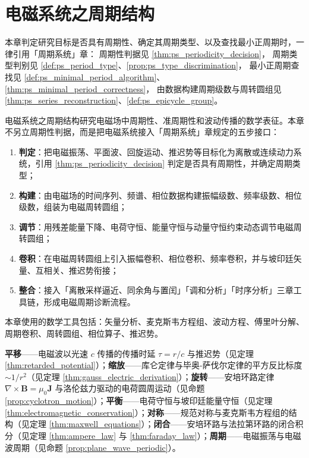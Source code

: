 \chapter{电磁系统之周期结构}

\begin{remark}[本章目标的周期性判定（引用）]\label{rem:em_ps_hook}
本章判定研究目标是否具有周期性、确定其周期类型、以及查找最小正周期时，一律引用「周期系统」章：
周期性判据见 \cref{thm:ps_periodicity_decision}，
周期类型判别见 \cref{def:ps_period_type}、\cref{prop:ps_type_discrimination}，
最小正周期查找见 \cref{def:ps_minimal_period_algorithm}、\cref{thm:ps_minimal_period_correctness}，
由数据构建周期级数与周转圆组见 \cref{thm:ps_series_reconstruction}、\cref{def:ps_epicycle_group}。
\end{remark}

\begin{remark}\label{rem:em_five_steps_positioning}
电磁系统之周期结构研究电磁场中周期性、准周期性和波动传播的数学表征。本章不另立周期性判据，而是把电磁系统接入「周期系统」章规定的五步接口：
\begin{enumerate}[label=(\arabic*)]
    \item \textbf{判定}：把电磁振荡、平面波、回旋运动、推迟势等目标化为离散或连续动力系统，引用 \cref{thm:ps_periodicity_decision} 判定是否具有周期性，并确定周期类型；
    \item \textbf{构建}：由电磁场的时间序列、频谱、相位数据构建振幅级数、频率级数、相位级数，组装为电磁周转圆组；
    \item \textbf{调节}：用残差能量下降、电荷守恒、能量守恒与动量守恒约束动态调节电磁周转圆组；
    \item \textbf{卷积}：在电磁周转圆组上引入振幅卷积、相位卷积、频率卷积，并与坡印廷矢量、互相关、推迟势衔接；
    \item \textbf{整合}：接入「离散采样逼近、同余角与置闰」「调和分析」「时序分析」三章工具链，形成电磁周期诊断流程。
\end{enumerate}
本章使用的数学工具包括：矢量分析、麦克斯韦方程组、波动方程、傅里叶分解、周期卷积、周转圆组、相位算子、推迟势。
\end{remark}

\begin{remark}[本章七主题导引]\label{rem:em_seven_themes}
\textbf{平移}——电磁波以光速 $c$ 传播的传播时延 $\tau = r/c$ 与推迟势（见定理 \ref{thm:retarded_potential}）；\textbf{缩放}——库仑定律与毕奥-萨伐尔定律的平方反比标度 $\sim 1/r^2$（见定理 \ref{thm:gauss_electric_derivation}）；\textbf{旋转}——安培环路定律 $\nabla\times\mathbf{B}=\mu_0\mathbf{J}$ 与洛伦兹力驱动的电荷圆周运动（见命题 \ref{prop:cyclotron_motion}）；\textbf{平衡}——电荷守恒与坡印廷能量守恒（见定理 \ref{thm:electromagnetic_conservation}）；\textbf{对称}——规范对称与麦克斯韦方程组的结构（见定理 \ref{thm:maxwell_equations}）；\textbf{闭合}——安培环路与法拉第环路的闭合积分（见定理 \ref{thm:ampere_law} 与 \ref{thm:faraday_law}）；\textbf{周期}——电磁振荡与电磁波周期（见命题 \ref{prop:plane_wave_periodic}）。
\end{remark}

